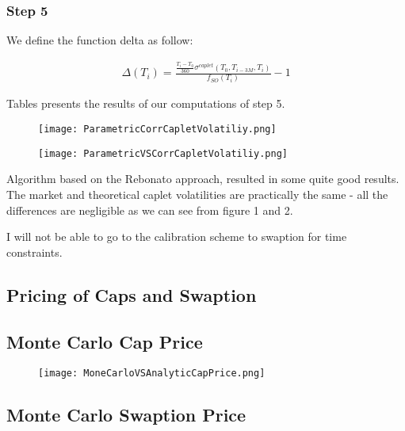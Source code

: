 \documentclass[11pt]{article}
\numberwithin{equation}{subsection}
\begin{document}
\subsubsection*{Step 5}
We define the function delta as follow:

\begin{eqnarray*}
	\Delta (T_i) = \frac{\frac{T_i-T_0}{360} \sigma^{caplet}(T_0, T_{i-3M}, T_i)}{f_{SO}(T_i)}-1
\end{eqnarray*}

Tables presents the results of our computations of step 5.

\begin{figure}[H]
	\texttt{[image: ParametricCorrCapletVolatiliy.png]}
\end{figure}


\begin{figure}[H]
	\texttt{[image: ParametricVSCorrCapletVolatiliy.png]}
\end{figure}



Algorithm based on the Rebonato approach, resulted in some quite good results. The market and
theoretical caplet volatilities are practically the same - all the differences are negligible as we can see from figure 1 and 2.

I will not be able to go to the calibration scheme to swaption for time constraints.

\subsection{Pricing of Caps and Swaption}
\subsection{Monte Carlo Cap Price}

\begin{figure}[H]
	\texttt{[image: MoneCarloVSAnalyticCapPrice.png]}
\end{figure}


\subsection{Monte Carlo Swaption Price}
\end{document}
